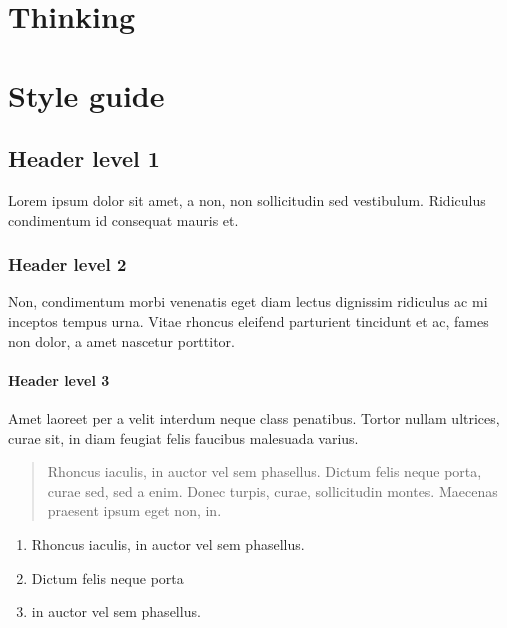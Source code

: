 \documentclass[
  oneside,
  12pt]{crumpbook}
\providecommand{\tightlist}{%
  \setlength{\itemsep}{0pt}\setlength{\parskip}{0pt}}
\begin{document}
\hypertarget{thinking}{%
\chapter{Thinking}\label{thinking}}

\hypertarget{style-guide}{%
\chapter*{Style guide}\label{style-guide}}

\hypertarget{header-level-1}{%
\section{Header level 1}\label{header-level-1}}

Lorem ipsum dolor sit amet, a non, non sollicitudin sed vestibulum. Ridiculus condimentum id consequat mauris et.

\hypertarget{header-level-2}{%
\subsection{Header level 2}\label{header-level-2}}

Non, condimentum morbi venenatis eget diam lectus dignissim ridiculus ac mi inceptos tempus urna. Vitae rhoncus eleifend parturient tincidunt et ac, fames non dolor, a amet nascetur porttitor.

\hypertarget{header-level-3}{%
\subsubsection{Header level 3}\label{header-level-3}}

Amet laoreet per a velit interdum neque class penatibus. Tortor nullam ultrices, curae sit, in diam feugiat felis faucibus malesuada varius.

\begin{quote}
Rhoncus iaculis, in auctor vel sem phasellus. Dictum felis neque porta, curae sed, sed a enim. Donec turpis, curae, sollicitudin montes. Maecenas praesent ipsum eget non, in.
\end{quote}

\begin{enumerate}
\def\labelenumi{\arabic{enumi}.}
\tightlist
\item
  Rhoncus iaculis, in auctor vel sem phasellus.
\item
  Dictum felis neque porta
\item
  in auctor vel sem phasellus.
\end{enumerate}
\end{document}
